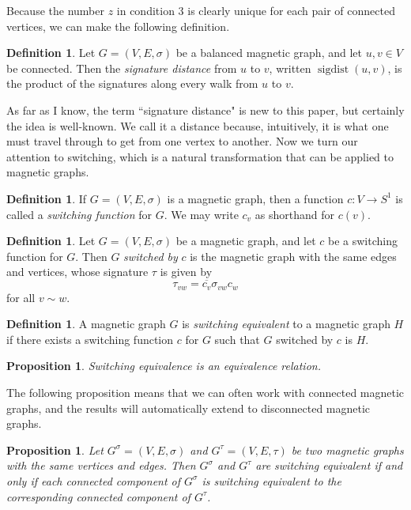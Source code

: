 \documentclass{article}
\newtheorem{prop}[thm]{Proposition}
\theoremstyle{definition}
\newtheorem{defn}[thm]{Definition}
\DeclareMathOperator{\sigdist}{sigdist}
\begin{document}
Because the number $z$ in condition 3 is clearly unique for each pair of connected vertices, we can make the following definition.

\begin{defn}\label{defn sigdist}
    Let $G=(V, E, \sigma)$ be a balanced magnetic graph, and let $u, v \in V$ be connected. Then the \textit{signature distance} from $u$ to $v$, written $\sigdist (u, v)$, is the product of the signatures along every walk from $u$ to $v$.
\end{defn}

As far as I know, the term ``signature distance" is new to this paper, but certainly the idea is well-known. We call it a distance because, intuitively, it is what one must travel through to get from one vertex to another. Now we turn our attention to switching, which is a natural transformation that can be applied to magnetic graphs.

\begin{defn}
    If $G=(V, E, \sigma)$ is a magnetic graph, then a function $c: V \rightarrow S^1$ is called a \textit{switching function} for $G$. We may write $c_v$ as shorthand for $c(v)$.
\end{defn}

\begin{defn}
    Let $G = (V, E, \sigma)$ be a magnetic graph, and let $c$ be a switching function for $G$. Then $G$ \textit{switched by} $c$ is the magnetic graph with the same edges and vertices, whose signature $\tau$ is given by
    $$\tau_{vw} = \overline{c_v}\sigma_{vw}c_w$$
    for all $v \sim w$.
\end{defn}

\begin{defn}
    A magnetic graph $G$ is \textit{switching equivalent} to a magnetic graph $H$ if there exists a switching function $c$ for $G$ such that $G$ switched by $c$ is $H$.   
\end{defn}

\begin{prop}
Switching equivalence is an equivalence relation.
\end{prop}

The following proposition means that we can often work with connected magnetic graphs, and the results will automatically extend to disconnected magnetic graphs.

\begin{prop}\label{switching equivalence of connected components}
    Let $G^\sigma = (V, E, \sigma)$ and $G^\tau = (V, E, \tau)$ be two magnetic graphs with the same vertices and edges. Then $G^\sigma$ and $G^\tau$ are switching equivalent if and only if each connected component of $G^\sigma$ is switching equivalent to the corresponding connected component of $G^\tau$.
\end{prop}
\end{document}
